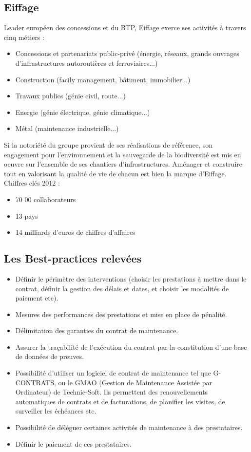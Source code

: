     \subsection{Eiffage}
    	Leader européen des concessions et du BTP, Eiffage exerce ses activités à travers cinq métiers :
    \begin{itemize}
    	\item Concessions et partenariats public-privé (énergie, réseaux, grands ouvrages d'infrastructures autoroutières et ferroviaires...)
    	\item Construction (facily management, bâtiment, immobilier...)
    	\item Travaux publics (génie civil, route...)
    	\item Energie (génie électrique, génie climatique...)
    	\item Métal (maintenance industrielle...)
    \end{itemize}
    \bigbreak
    	Si la notoriété du groupe provient de ses réalisations de référence, son engagement pour l'environnement et la sauvegarde de la biodiversité est mis en oeuvre sur l'ensemble de ses chantiers d'infrastructures. Aménager et construire tout en valorisant la qualité de vie de chacun est bien la marque d'Eiffage.
    \bigbreak
    Chiffres clés 2012 :
    \begin{itemize}
    	\item 70 00 collaborateurs
    	\item 13 pays
    	\item 14 milliards d'euros de chiffres d'affaires
    \end{itemize}

    \subsection{Les Best-practices relevées}
    \begin{itemize}
    	\item Définir le périmètre des interventions (choisir les prestations à mettre dans le contrat, définir la gestion des délais et dates, et choisir les modalités de paiement etc).
    	\item Mesures des performances des prestations et mise en place de pénalité.
    	\item Délimitation des garanties du contrat de maintenance.
    	\item Assurer la traçabilité de l'exécution du contrat par la constitution d'une base de données de preuves.
    	\item Possibilité d'utiliser un logiciel de contrat de maintenance tel que G-CONTRATS, ou le GMAO (Gestion de Maintenance Assistée par Ordinateur) de Technic-Soft. Ils permettent des renouvellements automatiques de contrats et de facturations, de planifier les visites, de surveiller les échéances etc.
    	\item Possibilité de déléguer certaines activités de maintenance à des prestataires.
    	\item Définir le paiement de ces prestataires.
    \end{itemize}



